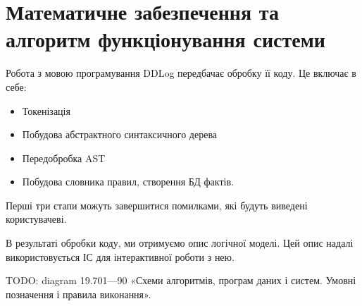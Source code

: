 \section{Математичне забезпечення та алгоритм функціонування системи}

Робота з мовою програмування DDLog передбачає обробку її коду. Це включає в себе:

\begin{itemize}
	\item Токенізація
	\item Побудова абстрактного синтаксичного дерева
	\item Передобробка AST
	\item Побудова словника правил, створення БД фактів.
\end{itemize}

Перші три єтапи можуть завершитися помилками, які будуть виведені користувачеві.

В результаті обробки коду, ми отримуємо опис логічної моделі. Цей опис надалі використовується ІС для інтерактивної роботи з нею.

TODO: diagram 19.701—90 «Схеми алгоритмів, програм даних і систем. Умовні позначення і правила виконання».



